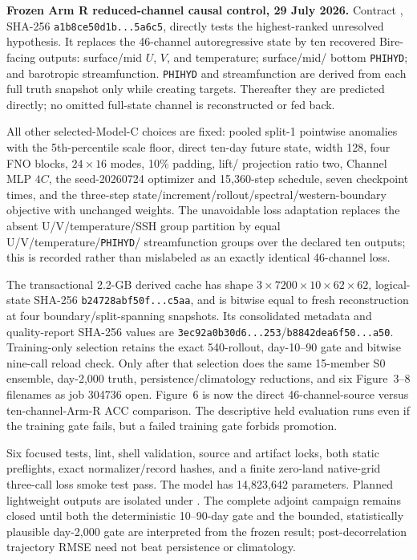 \documentclass[11pt]{article}
\begin{document}
\textbf{Frozen Arm R reduced-channel causal control, 29 July 2026.}
Contract , SHA-256
\texttt{a1b8ce50d1b...5a6c5}, directly tests the highest-ranked unresolved
hypothesis.  It replaces the 46-channel autoregressive state by ten recovered
Bire-facing outputs: surface/mid \(U\), \(V\), and temperature; surface/mid/
bottom \texttt{PHIHYD}; and barotropic streamfunction.  \texttt{PHIHYD} and
streamfunction are derived from each full truth snapshot only while creating
targets.  Thereafter they are predicted directly; no omitted full-state
channel is reconstructed or fed back.

All other selected-Model-C choices are fixed: pooled split-1 pointwise
anomalies with the 5th-percentile scale floor, direct ten-day future state,
width 128, four FNO blocks, \(24\times16\) modes, 10\% padding, lift/
projection ratio two, Channel MLP \(4C\), the seed-20260724 optimizer and
15,360-step schedule, seven checkpoint times, and the three-step
state/increment/rollout/spectral/western-boundary objective with unchanged
weights.  The unavoidable loss adaptation replaces the absent
U/V/temperature/SSH group partition by equal U/V/temperature/\texttt{PHIHYD}/
streamfunction groups over the declared ten outputs; this is recorded rather
than mislabeled as an exactly identical 46-channel loss.

The transactional 2.2-GB derived cache has shape
\(3\times7200\times10\times62\times62\), logical-state SHA-256
\texttt{b24728abf50f...c5aa}, and is bitwise equal to fresh reconstruction at
four boundary/split-spanning snapshots.  Its consolidated metadata and
quality-report SHA-256 values are
\texttt{3ec92a0b30d6...253}/\texttt{b8842dea6f50...a50}.
Training-only selection retains the exact 540-rollout, day-10--90 gate and
bitwise nine-call reload check.  Only after that selection does the same
15-member S0 ensemble, day-2,000 truth, persistence/climatology reductions,
and six Figure~3--8 filenames as job 304736 open.  Figure~6 is now the direct
46-channel-source versus ten-channel-Arm-R ACC comparison.  The descriptive
held evaluation runs even if the training gate fails, but a failed training
gate forbids promotion.

Six focused tests, lint, shell validation, source and artifact locks, both
static preflights, exact normalizer/record hashes, and a finite zero-land
native-grid three-call loss smoke test pass.  The model has 14,823,642
parameters.  Planned lightweight outputs are isolated under
.
The complete adjoint campaign remains closed until both the deterministic
10--90-day gate and the bounded, statistically plausible day-2,000 gate are
interpreted from the frozen result; post-decorrelation trajectory RMSE need
not beat persistence or climatology.
\end{document}
